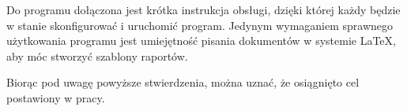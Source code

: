 \par
Do programu dołączona jest krótka instrukcja obsługi, dzięki której każdy będzie w stanie skonfigurować i uruchomić program. Jedynym wymaganiem sprawnego użytkowania programu jest umiejętność pisania dokumentów w systemie LaTeX, aby móc stworzyć szablony raportów.
\vspace{5mm}
\par 
Biorąc pod uwagę powyższe stwierdzenia, można uznać, że osiągnięto cel postawiony  w pracy.